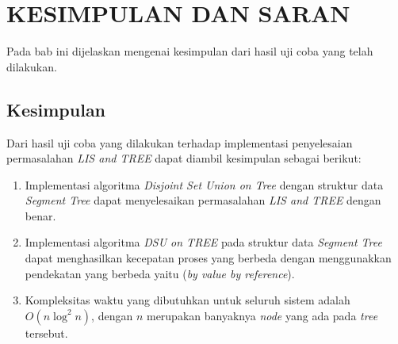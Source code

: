 \chapter{KESIMPULAN DAN SARAN}

Pada bab ini dijelaskan mengenai kesimpulan dari hasil uji coba yang telah dilakukan.

\section{\quad Kesimpulan}
\quad Dari hasil uji coba yang dilakukan terhadap implementasi penyelesaian permasalahan \textit{LIS and TREE} dapat diambil kesimpulan sebagai berikut:
\begin{enumerate}
	\item Implementasi algoritma \textit{Disjoint Set Union on Tree} dengan struktur data \textit{Segment Tree} dapat menyelesaikan permasalahan \textit{LIS and TREE} dengan benar.
	\item Implementasi algoritma \textit{DSU on TREE} pada struktur data \textit{Segment Tree} dapat menghasilkan kecepatan proses yang berbeda dengan menggunakkan pendekatan yang berbeda yaitu (\textit{by value \text{\&} by reference}).
	\item Kompleksitas waktu yang dibutuhkan untuk seluruh sistem adalah $O(n\log^{2}n)$, dengan $n$ merupakan banyaknya \textit{node} yang ada pada \textit{tree} tersebut.
\end{enumerate}